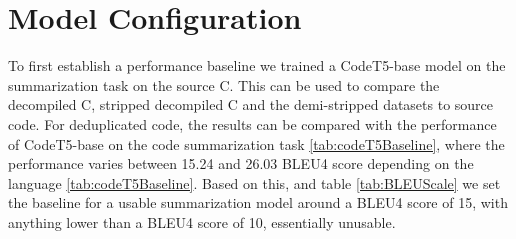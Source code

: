 \section{Model Configuration}
To first establish a performance baseline we trained a CodeT5-base model on the summarization task on the source C. This can be used to compare the decompiled C, stripped decompiled C and the demi-stripped datasets to source code. For deduplicated code, the results can be compared with the performance of CodeT5-base on the code summarization task \ref{tab:codeT5Baseline}, where the performance varies between 15.24 and 26.03 BLEU4 score depending on the language \ref{tab:codeT5Baseline}. Based on this, and table \ref{tab:BLEUScale} we set the baseline for a usable summarization model around a BLEU4 score of 15, with anything lower than a BLEU4 score of 10, essentially unusable.


